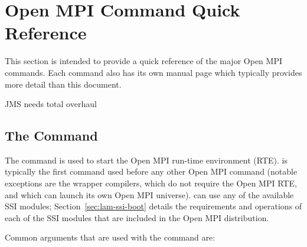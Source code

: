 %
% 
% 
%

\chapter{Open MPI Command Quick Reference}
\label{sec:commands}

This section is intended to provide a quick reference of the major
Open MPI commands.  Each command also has its own manual page which
typically provides more detail than this document.

{\Huge JMS needs total overhaul}


\section{The  Command}
\label{sec:commands-lamboot}

The  command is used to start the Open MPI run-time
environment (RTE).   is typically the first command used
before any other Open MPI command (notable exceptions are the wrapper
compilers, which do not require the Open MPI RTE, and  which
can launch its own Open MPI universe).   can use any of the
available  SSI modules; Section~\ref{sec:lam-ssi-boot}
details the requirements and operations of each of the  SSI
modules that are included in the Open MPI distribution.

Common arguments that are used with the  command are:

